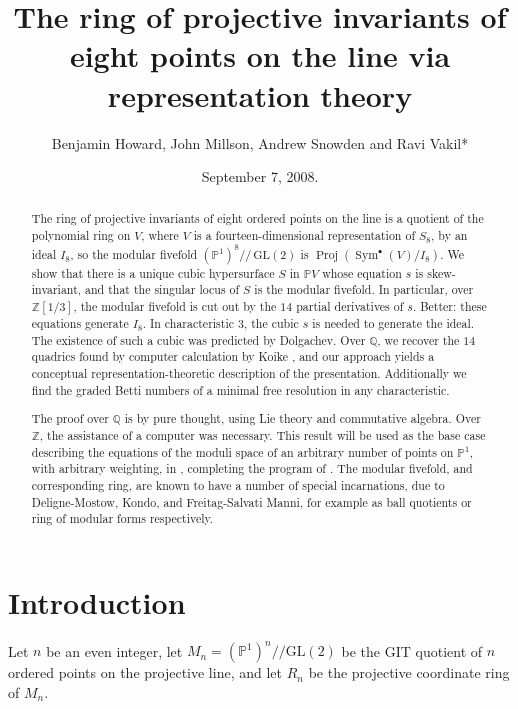 \documentclass{amsart}
\title{The ring of projective invariants of eight points on the line via
representation theory}
\author[Benjamin Howard, John Millson, Andrew Snowden and Ravi Vakil]
{Benjamin Howard, John Millson, Andrew Snowden and Ravi Vakil*}
\date{September 7, 2008.}
\theoremstyle{definition}
\theoremstyle{remark}
\DeclareMathOperator{\Proj}{Proj}
\DeclareMathOperator{\Sym}{Sym}
\def\GL{\mathrm{GL}}
\def\Z{\mathbb{Z}}
\def\P{\mathbb{P}}
\def\Q{\mathbb{Q}}
\def\cq{/\!/}
\begin{document}

\begin{abstract}
  The ring of projective invariants of eight ordered points on the
  line is a quotient of the polynomial ring on $V$, where $V$ is a
  fourteen-dimensional representation of $S_8$, by an ideal $I_8$,
  so the modular fivefold $(\P^1)^8 \cq\, \GL(2)$ is $\Proj(\Sym^{\bullet}(V)/I_8)$.
  We show that there is a unique cubic hypersurface $S$ in $\P V$ whose
  equation $s$ is skew-invariant, and that the singular locus of $S$
  is the modular fivefold.  In particular, over $\Z[1/3]$, the modular
  fivefold is cut out by the $14$ partial derivatives of $s$.  Better:
  these equations generate $I_8$.  In characteristic 3, the cubic $s$ is
  needed to generate the ideal.  The existence of such a cubic was
  predicted by Dolgachev. Over $\Q$, we recover the $14$ quadrics
  found by computer calculation by Koike \cite{koike}, and our
  approach yields a conceptual representation-theoretic description of
  the presentation.  Additionally we find the graded Betti numbers 
  of a minimal free resolution in any characteristic.

  The proof over $\Q$ is by pure thought, using Lie theory and commutative algebra.
  Over $\Z$, the assistance of a computer
  was necessary.  This result will be used as the base case
  describing the equations of the moduli space of an arbitrary number of points
  on $\P^1$, with arbitrary weighting, in \cite{HMSV}, completing
  the program of  \cite{hmsv1}.  The modular fivefold, and corresponding ring,
  are known to have a number of
  special incarnations, due to Deligne-Mostow, Kondo, and Freitag-Salvati
  Manni, for example as ball quotients or ring of modular forms respectively.
\end{abstract}


\maketitle

\tableofcontents



\section{Introduction}

Let $n$ be an even integer, let $M_n=(\P^1)^n \cq \GL(2)$ be the GIT
quotient of $n$ ordered points on the projective line, and let $R_n$
be the projective coordinate ring of $M_n$.
\end{document}
